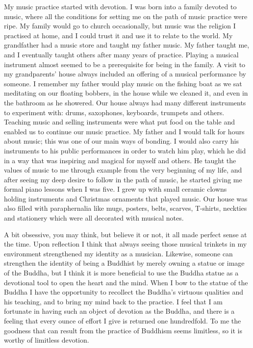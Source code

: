 My music practice started with devotion. I was born into a family
devoted to music, where all the conditions for setting me on the path of
music practice were ripe. My family would go to church occasionally, but
music was the religion I practised at home, and I could trust it and use
it to relate to the world. My grandfather had a music store and taught
my father music. My father taught me, and I eventually taught others
after many years of practice. Playing a musical instrument almost seemed
to be a prerequisite for being in the family. A visit to my
grandparents' house always included an offering of a musical performance
by someone. I remember my father would play music on the fishing boat as
we sat meditating on our floating bobbers, in the house while we cleaned
it, and even in the bathroom as he showered. Our house always had many
different instruments to experiment with: drums, saxophones, keyboards,
trumpets and others. Teaching music and selling instruments were what
put food on the table and enabled us to continue our music practice. My
father and I would talk for hours about music; this was one of our main
ways of bonding. I would also carry his instruments to his public
performances in order to watch him play, which he did in a way that was
inspiring and magical for myself and others. He taught the values of
music to me through example from the very beginning of my life, and
after seeing my deep desire to follow in the path of music, he started
giving me formal piano lessons when I was five. I grew up with small
ceramic clowns holding instruments and Christmas ornaments that played
music. Our house was also filled with paraphernalia like mugs, posters,
belts, scarves, T-shirts, neckties and stationery which were all
decorated with musical notes.

A bit obsessive, you may think, but believe it or not, it all made
perfect sense at the time. Upon reflection I think that always seeing
those musical trinkets in my environment strengthened my identity as a
musician. Likewise, someone can strengthen the identity of being a
Buddhist by merely owning a statue or image of the Buddha, but I think
it is more beneficial to use the Buddha statue as a devotional tool to
open the heart and the mind. When I bow to the statue of the Buddha I
have the opportunity to recollect the Buddha's virtuous qualities and
his teaching, and to bring my mind back to the practice. I feel that I
am fortunate in having such an object of devotion as the Buddha, and
there is a feeling that every ounce of effort I give is returned one
hundredfold. To me the goodness that can result from the practice of
Buddhism seems limitless, so it is worthy of limitless devotion.

